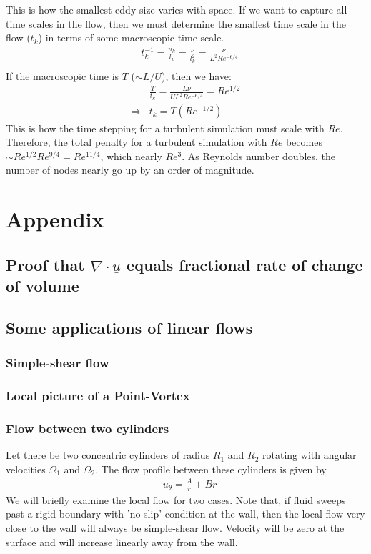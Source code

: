 \documentclass[11pt,a4paper]{article}
\newcommand{\vv}[1]{\underline{#1}}
\newcommand{\1}{\vect{1}}
\newcommand{\grad}{\nabla}
\newcommand{\RA}{\Rightarrow}
\begin{document}
This is how the smallest eddy size varies with space. If we want to capture all time scales in the flow, then we must determine the smallest time scale in the flow ($t_k$) in terms of some macroscopic time scale.
\begin{align*}
&t_k^{-1} = \frac{u_k}{l_k} = \frac{\nu}{l_k^2} =\frac{\nu}{L^2 Re^{-6/4}} \\ 
\end{align*}
If the macroscopic time is $T$ ($\sim L/U$), then we have:
\begin{align*}
&\frac{T}{t_k} = \frac{L \nu}{U L^2 Re^{-6/4}} = Re^{1/2}\\
\RA& t_k = T (Re^{-1/2})
\end{align*}
This is how the time stepping for a turbulent simulation must scale with $Re$. Therefore, the total penalty for a turbulent simulation with $Re$ becomes $\sim Re^{1/2}  Re^{9/4} = Re^{11/4}$, which nearly $Re^3$. As Reynolds number doubles, the number of nodes nearly go up by an order of magnitude.


\section{Appendix}

\subsection{Proof that $\grad\cdot \vv u$ equals fractional rate of change of volume}


\subsection{Some applications of linear flows}

\subsubsection{Simple-shear flow}

\subsubsection{Local picture of a Point-Vortex}

\subsubsection{Flow between two cylinders}
Let there be two concentric cylinders of radius $R_1$ and $R_2$ rotating with angular velocities $\Omega_1$ and $\Omega_2$. The flow profile between these cylinders is given by
\begin{align*}
&u_{\theta} = \frac{A}{r} + Br
\end{align*}
We will briefly examine the local flow for two cases. Note that, if fluid sweeps past a rigid boundary with 'no-slip' condition at the wall, then the local flow very close to the wall will always be simple-shear flow. Velocity will be zero at the surface and will increase linearly away from the wall.
\end{document}
